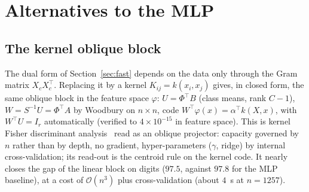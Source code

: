 \documentclass[11pt,a4paper]{article}
\theoremstyle{plain}
\theoremstyle{definition}
\theoremstyle{remark}
\newcommand{\T}{\top}
\begin{document}
\section{Alternatives to the MLP}
\label{sec:alternatives}

\subsection{The kernel oblique block}
The dual form of Section~\ref{sec:fast} depends on the data only through the
Gram matrix $X_cX_c^\T$. Replacing it by a kernel $K_{ij}=k(x_i,x_j)$ gives,
in closed form, the same oblique block in the feature space $\varphi$:
$U=\Phi^\T B$ (class means, rank $C-1$), $W=S^{-1}U=\Phi^\T A$ by Woodbury on
$n\times n$, code $W^\T\varphi(x)=\alpha^\T k(X,x)$, with $W^\T U=I_r$
automatically (verified to $4\times10^{-15}$ in feature space). This is
kernel Fisher discriminant analysis~\cite{mika1999kfd} read as an oblique
projector: capacity
governed by $n$ rather than by depth, no gradient, hyper-parameters
($\gamma$, ridge) by internal cross-validation; its read-out is the
centroid rule on the kernel code. It nearly closes the gap of the linear
block on digits ($97.5$, against $97.8$ for the MLP baseline), at a cost of
$\mathcal O(n^3)$ plus cross-validation (about $4$~s at $n=1257$).
\end{document}
